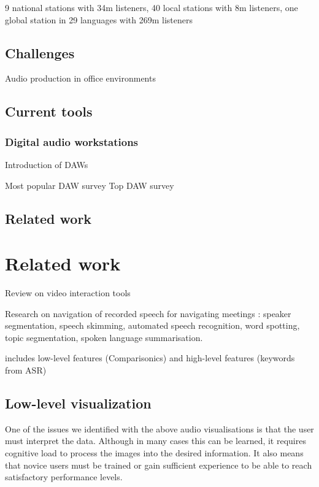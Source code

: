 9 national stations with 34m listeners, 40 local stations with 8m listeners, one global station in 29 languages with
269m listeners

\subsection{Challenges}

Audio production in office environments \citep{Brixen2003}

\subsection{Current tools}

\subsubsection{Digital audio workstations}

Introduction of DAWs \citep{Ingebretsen1982}

Most popular DAW survey \citep{AskAudio2015}
Top DAW survey \citep{ProducerSpot2015}

\subsection{Related work}

\citep{Barbour2004}
\citep{Dunaway2000}
\citep{Sampaio2016}

\section{Related work}


Review on video interaction tools \citep{Schoeffmann2015}

Research on navigation of recorded speech for navigating meetings \citep{Bouamrane2007}: speaker segmentation, speech
skimming, automated speech recognition, word spotting, topic segmentation, spoken language summarisation.

\citet{Loviscach2011a} includes low-level features (Comparisonics) and high-level features (keywords from ASR)


\subsection{Low-level visualization}

One of the issues we identified with the above audio visualisations is that the user must interpret the data. Although
in many cases this can be learned, it requires cognitive load to process the images into the desired information. It
also means that novice users must be trained or gain sufficient experience to be able to reach satisfactory performance
levels.

